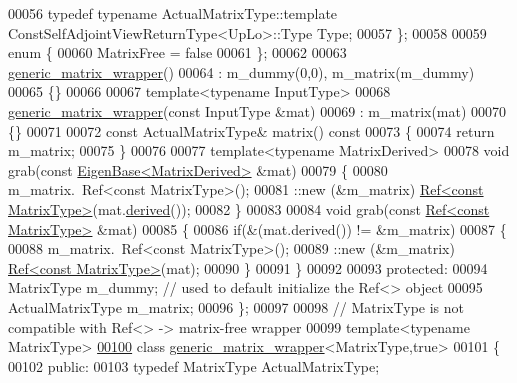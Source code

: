 \begin{DoxyCode}
00056     \textcolor{keyword}{typedef} \textcolor{keyword}{typename} ActualMatrixType::template ConstSelfAdjointViewReturnType<UpLo>::Type Type;
00057   \};
00058 
00059   \textcolor{keyword}{enum} \{
00060     MatrixFree = \textcolor{keyword}{false}
00061   \};
00062 
00063   \hyperlink{class_eigen_1_1internal_1_1generic__matrix__wrapper}{generic\_matrix\_wrapper}()
00064     : m\_dummy(0,0), m\_matrix(m\_dummy)
00065   \{\}
00066 
00067   \textcolor{keyword}{template}<\textcolor{keyword}{typename} InputType>
00068   \hyperlink{class_eigen_1_1internal_1_1generic__matrix__wrapper}{generic\_matrix\_wrapper}(\textcolor{keyword}{const} InputType &mat)
00069     : m\_matrix(mat)
00070   \{\}
00071 
00072   \textcolor{keyword}{const} ActualMatrixType& matrix()\textcolor{keyword}{ const}
00073 \textcolor{keyword}{  }\{
00074     \textcolor{keywordflow}{return} m\_matrix;
00075   \}
00076 
00077   \textcolor{keyword}{template}<\textcolor{keyword}{typename} MatrixDerived>
00078   \textcolor{keywordtype}{void} grab(\textcolor{keyword}{const} \hyperlink{group___core___module_struct_eigen_1_1_eigen_base}{EigenBase<MatrixDerived>} &mat)
00079   \{
00080     m\_matrix.~Ref<\textcolor{keyword}{const} MatrixType>();
00081     ::new (&m\_matrix) \hyperlink{group___core___module}{Ref<const MatrixType>}(mat.\hyperlink{group___core___module_a324b16961a11d2ecfd2d1b7dd7946545}{derived}());
00082   \}
00083 
00084   \textcolor{keywordtype}{void} grab(\textcolor{keyword}{const} \hyperlink{group___core___module}{Ref<const MatrixType>} &mat)
00085   \{
00086     \textcolor{keywordflow}{if}(&(mat.derived()) != &m\_matrix)
00087     \{
00088       m\_matrix.~Ref<\textcolor{keyword}{const} MatrixType>();
00089       ::new (&m\_matrix) \hyperlink{group___core___module}{Ref<const MatrixType>}(mat);
00090     \}
00091   \}
00092 
00093 \textcolor{keyword}{protected}:
00094   MatrixType m\_dummy; \textcolor{comment}{// used to default initialize the Ref<> object}
00095   ActualMatrixType m\_matrix;
00096 \};
00097 
00098 \textcolor{comment}{// MatrixType is not compatible with Ref<> -> matrix-free wrapper}
00099 \textcolor{keyword}{template}<\textcolor{keyword}{typename} MatrixType>
\hyperlink{class_eigen_1_1internal_1_1generic__matrix__wrapper_3_01_matrix_type_00_01true_01_4}{00100} \textcolor{keyword}{class }\hyperlink{class_eigen_1_1internal_1_1generic__matrix__wrapper}{generic\_matrix\_wrapper}<MatrixType,true>
00101 \{
00102 \textcolor{keyword}{public}:
00103   \textcolor{keyword}{typedef} MatrixType ActualMatrixType;

\end{DoxyCode}
